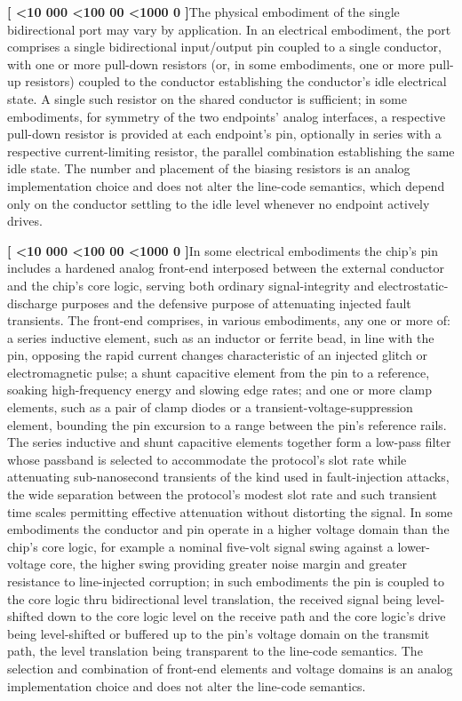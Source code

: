 \documentclass[12pt,letterpaper]{article}
\newcounter{para}
\newcommand{\padzero}{%
  \ifnum\value{para}<10 000\else%
  \ifnum\value{para}<100 00\else%
  \ifnum\value{para}<1000 0\else%
  \fi\fi\fi}
\newcommand{\para}{%
  \refstepcounter{para}\noindent\textbf{[\padzero\arabic{para}]}\hspace{0.5em}\ignorespaces}
\begin{document}
\para The physical embodiment of the single bidirectional port may vary by application. In an electrical embodiment, the port comprises a single bidirectional input/output pin coupled to a single conductor, with one or more pull-down resistors (or, in some embodiments, one or more pull-up resistors) coupled to the conductor establishing the conductor's idle electrical state. A single such resistor on the shared conductor is sufficient; in some embodiments, for symmetry of the two endpoints' analog interfaces, a respective pull-down resistor is provided at each endpoint's pin, optionally in series with a respective current-limiting resistor, the parallel combination establishing the same idle state. The number and placement of the biasing resistors is an analog implementation choice and does not alter the line-code semantics, which depend only on the conductor settling to the idle level whenever no endpoint actively drives.

\para In some electrical embodiments the chip's pin includes a hardened analog front-end interposed between the external conductor and the chip's core logic, serving both ordinary signal-integrity and electrostatic-discharge purposes and the defensive purpose of attenuating injected fault transients. The front-end comprises, in various embodiments, any one or more of: a series inductive element, such as an inductor or ferrite bead, in line with the pin, opposing the rapid current changes characteristic of an injected glitch or electromagnetic pulse; a shunt capacitive element from the pin to a reference, soaking high-frequency energy and slowing edge rates; and one or more clamp elements, such as a pair of clamp diodes or a transient-voltage-suppression element, bounding the pin excursion to a range between the pin's reference rails. The series inductive and shunt capacitive elements together form a low-pass filter whose passband is selected to accommodate the protocol's slot rate while attenuating sub-nanosecond transients of the kind used in fault-injection attacks, the wide separation between the protocol's modest slot rate and such transient time scales permitting effective attenuation without distorting the signal. In some embodiments the conductor and pin operate in a higher voltage domain than the chip's core logic, for example a nominal five-volt signal swing against a lower-voltage core, the higher swing providing greater noise margin and greater resistance to line-injected corruption; in such embodiments the pin is coupled to the core logic thru bidirectional level translation, the received signal being level-shifted down to the core logic level on the receive path and the core logic's drive being level-shifted or buffered up to the pin's voltage domain on the transmit path, the level translation being transparent to the line-code semantics. The selection and combination of front-end elements and voltage domains is an analog implementation choice and does not alter the line-code semantics.
\end{document}
